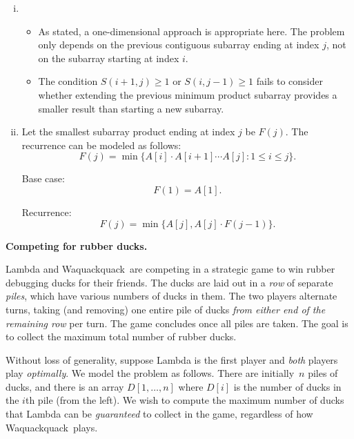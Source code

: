 \documentclass[11pt,addpoints,answers]{exam}
\begin{document}
\begin{questions}
\begin{parts}
  \begin{solution} 
    \begin{enumerate}[(i)]
      \item \begin{itemize}
        \item As stated, a one-dimensional approach is appropriate here. The problem only depends on the previous contiguous subarray ending at index $j$, not on the subarray starting at index $i$.
        \item The condition $S(i+1, j) \geq 1$ or $S(i, j-1) \geq 1$ fails to consider whether extending the previous minimum product subarray provides a smaller result than starting a new subarray.
      \end{itemize}
      \item
      Let the smallest subarray product ending at index $j$ be $F(j)$. The recurrence can be modeled as follows:
      \[
      F(j) = \min \{ A[i] \cdot A[i+1] \cdots A[j] : 1 \leq i \leq j \}.
      \]

      Base case:
      \[
      F(1) = A[1].
      \]

      Recurrence:
      \[
      F(j) = \min \{ A[j], A[j] \cdot F(j-1) \}.
      \]
    \end{enumerate}
  \end{solution}

  \end{parts}

\pagebreak
\question \textbf{Competing for rubber ducks.} 
  \newcommand{\Wqq}{Waquackquack}

  Lambda and \Wqq\ are competing in a strategic game to win rubber debugging ducks for their friends.
  The ducks are laid out in a \emph{row} of separate \emph{piles}, which have various numbers of ducks in them.
  The two players alternate turns, taking (and removing) one entire pile of ducks \emph{from either end of the remaining row} per turn.
  The game concludes once all piles are taken.
  The goal is to collect the maximum total number of rubber ducks.
  
  Without loss of generality, suppose Lambda is the first player and \emph{both} players play \emph{optimally}. We model the problem as follows.
  There are initially~$n$ piles of ducks, and there is an array $D[1, \ldots, n]$ where $D[i]$ is the number of ducks in the $i$th pile (from the left).
  We wish to compute the maximum number of ducks that Lambda can be \emph{guaranteed} to collect in the game, regardless of how \Wqq\ plays.


\end{questions}
\end{document}
